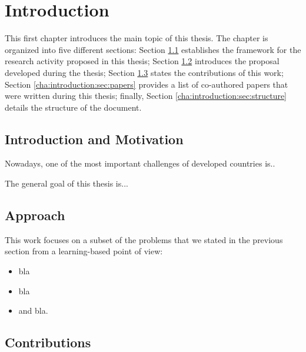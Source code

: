 \chapter{Introduction}
\label{cha:introduction}

\begin{chapterabstract}
This first chapter introduces the main topic of this thesis. The chapter is organized into five different sections: Section \ref{cha:introduction:sec:motivation} establishes the framework for the research activity proposed in this thesis; Section \ref{cha:introduction:sec:approach} introduces the proposal developed during the thesis; Section \ref{cha:introduction:sec:contributions} states the contributions of this work; Section \ref{cha:introduction:sec:papers} provides a list of co-authored papers that were written during this thesis; finally, Section \ref{cha:introduction:sec:structure} details the structure of the document.
\end{chapterabstract}

\minitoc

\clearpage

\section{Introduction and Motivation}
\label{cha:introduction:sec:motivation}

Nowadays, one of the most important challenges of developed countries is..


 The general goal of this thesis is...

\section{Approach}
\label{cha:introduction:sec:approach}

This work focuses on a subset of the problems that we stated in the previous section from a learning-based point of view:

\begin{itemize}
    \item bla
    \item bla
    \item and bla.
\end{itemize}


\section{Contributions}
\label{cha:introduction:sec:contributions}

